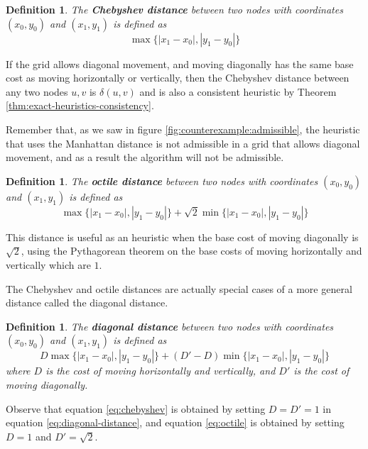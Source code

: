 \documentclass[12pt]{report}
\newtheorem{definition}[theorem]{Definition}
\begin{document}
\begin{definition}
The \textbf{Chebyshev distance} between two nodes with coordinates $(x_0, y_0)$ and $(x_1, y_1)$ is defined as
\begin{equation}
\max \{ |x_1 - x_0|, |y_1 - y_0| \}\label{eq:chebyshev}
\end{equation}
\end{definition}

If the grid allows diagonal movement, and moving diagonally has the same base cost as moving horizontally or vertically, then the Chebyshev distance between any two nodes $u, v$ is $\delta(u, v)$ and is also a consistent heuristic by Theorem \ref{thm:exact-heuristics-consistency}.

Remember that, as we saw in figure \ref{fig:counterexample:admissible}, the heuristic that uses the Manhattan distance is not admissible in a grid that allows diagonal movement, and as a result the algorithm will not be admissible.

\begin{definition}
The \textbf{octile distance} between two nodes with coordinates $(x_0, y_0)$ and $(x_1, y_1)$ is defined as
\begin{equation}
\max \{ |x_1 - x_0|, |y_1 - y_0| \} + \sqrt{2} \min \{ |x_1 - x_0|, |y_1 - y_0| \}\label{eq:octile}
\end{equation}
\end{definition}

This distance is useful as an heuristic when the base cost of moving diagonally is $\sqrt{2}$, using the Pythagorean theorem on the base costs of moving horizontally and vertically which are $1$.

The Chebyshev and octile distances are actually special cases of a more general distance called the diagonal distance.

\begin{definition}
The \textbf{diagonal distance} between two nodes with coordinates $(x_0, y_0)$ and $(x_1, y_1)$ is defined as
\begin{equation}
D \max \{ |x_1 - x_0|, |y_1 - y_0| \} + (D' - D) \min \{ |x_1 - x_0|, |y_1 - y_0| \}\label{eq:diagonal-distance}
\end{equation}
where $D$ is the cost of moving horizontally and vertically, and $D'$ is the cost of moving diagonally.
\end{definition}

Observe that equation \ref{eq:chebyshev} is obtained by setting $D = D' = 1$ in equation \ref{eq:diagonal-distance}, and equation \ref{eq:octile} is obtained by setting $D = 1$ and $D' = \sqrt{2}$.
\end{document}
